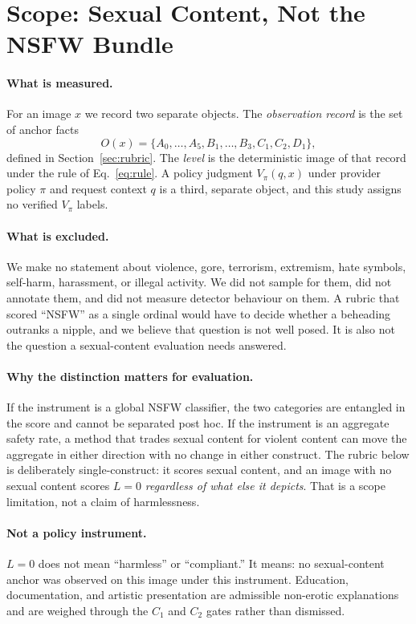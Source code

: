 \documentclass[11pt]{article}
\begin{document}
\section{Scope: Sexual Content, Not the NSFW Bundle}
\label{sec:scope}
\paragraph{What is measured.} For an image $x$ we record two separate objects. The \emph{observation record} is the set of anchor facts
\begin{equation}
 O(x)=\{A_0,\dots,A_5,B_1,\dots,B_3,C_1,C_2,D_1\},
\end{equation}
defined in Section~\ref{sec:rubric}. The \emph{level} is the deterministic image of that record under the rule of Eq.~\ref{eq:rule}. A policy judgment $V_\pi(q,x)$ under provider policy $\pi$ and request context $q$ is a third, separate object, and this study assigns no verified $V_\pi$ labels.

\paragraph{What is excluded.} We make no statement about violence, gore, terrorism, extremism, hate symbols, self-harm, harassment, or illegal activity. We did not sample for them, did not annotate them, and did not measure detector behaviour on them. A rubric that scored ``NSFW'' as a single ordinal would have to decide whether a beheading outranks a nipple, and we believe that question is not well posed. It is also not the question a sexual-content evaluation needs answered.

\paragraph{Why the distinction matters for evaluation.} If the instrument is a global NSFW classifier, the two categories are entangled in the score and cannot be separated post hoc. If the instrument is an aggregate safety rate, a method that trades sexual content for violent content can move the aggregate in either direction with no change in either construct. The rubric below is deliberately single-construct: it scores sexual content, and an image with no sexual content scores $L=0$ \emph{regardless of what else it depicts}. That is a scope limitation, not a claim of harmlessness.

\paragraph{Not a policy instrument.} $L=0$ does not mean ``harmless'' or ``compliant.'' It means: no sexual-content anchor was observed on this image under this instrument. Education, documentation, and artistic presentation are admissible non-erotic explanations and are weighed through the $C_1$ and $C_2$ gates rather than dismissed.
\end{document}
